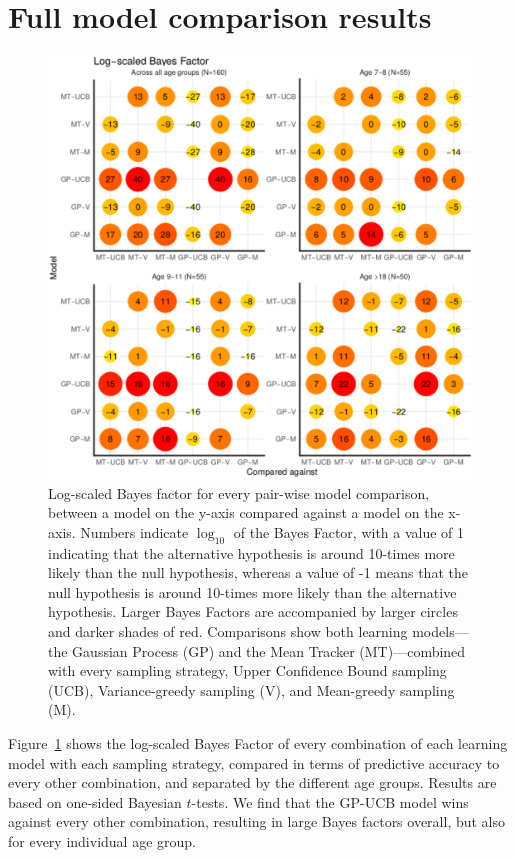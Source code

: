 \section*{Full model comparison results}
\begin{figure}[ht!]
\centering
\includegraphics[width=0.8\linewidth]{bayesfactor.pdf}
\caption{Log-scaled Bayes factor for every pair-wise model comparison, between a model on the y-axis compared against a model on the x-axis. Numbers indicate $\log_{10}$ of the Bayes Factor, with a value of 1 indicating that the alternative hypothesis is around 10-times more likely than the null hypothesis, whereas a value of -1 means that the null hypothesis is around 10-times more likely than the alternative hypothesis. Larger Bayes Factors are accompanied by larger circles and darker shades of red. Comparisons show both learning models---the Gaussian Process (GP) and the Mean Tracker (MT)---combined with every sampling strategy, Upper Confidence Bound sampling (UCB), Variance-greedy sampling (V), and Mean-greedy sampling (M).} 
\label{fig:bayesfactor}
\vspace{-1mm}
\end{figure}

Figure~\ref{fig:bayesfactor} shows the log-scaled Bayes Factor of every combination of each learning model with each sampling strategy, compared in terms of predictive accuracy to every other combination, and separated by the different age groups. Results are based on one-sided Bayesian $t$-tests. We find that the GP-UCB model wins against every other combination, resulting in large Bayes factors overall, but also for every individual age group. 


